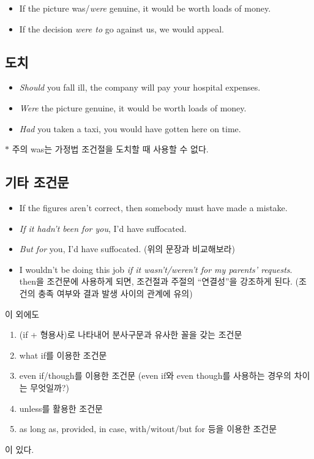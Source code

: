 \documentclass[ a4paper]{oblivoir}
\begin{document}
    \begin{itemize}[label = {--}]
        \item If the picture was/\emph{were} genuine, it would be worth loads of money. 
        \item If the decision \emph{were to} go against us, we would appeal.
    \end{itemize}


    \subsection{도치}


    \begin{itemize}[label = {--}]
        \item \emph{Should} you fall ill, the company will pay your hospital expenses.
        \item \emph{Were} the picture genuine, it would be worth loads of money.
        \item \emph{Had} you taken a taxi, you would have gotten here on time.
    \end{itemize}

    {\footnotesize $\ast$ 주의 was는 가정법 조건절을 도치할 때 사용할 수 없다.}

    \subsection{기타 조건문}
    \begin{itemize}[label = {--}]
        \item If the figures aren't correct, then somebody must have made a mistake.
        \item \emph{If it hadn't been for you}, I'd have suffocated.
        \item \emph{But for} you, I'd have suffocated. (위의 문장과 비교해보라)
        \item I wouldn't be doing this job \emph{if it wasn't/weren't for my parents' requests}. \\
            then을 조건문에 사용하게 되면, 조건절과 주절의 ``연결성''을 강조하게 된다. (조건의 충족 여부와 결과 발생 사이의 관계에 유의)
    \end{itemize}


    
    이 외에도
    \begin{enumerate}
     \item (if + 형용사)로 나타내어 분사구문과 유사한 꼴을 갖는 조건문
     \item what if를 이용한 조건문
     \item even if/though를 이용한 조건문 (even if와 even though를 사용하는 경우의 차이는 무엇일까?)
     \item unless를 활용한 조건문
     \item as long as, provided, in case, with/witout/but for 등을 이용한 조건문
    \end{enumerate}
    이 있다. 
\end{document}
